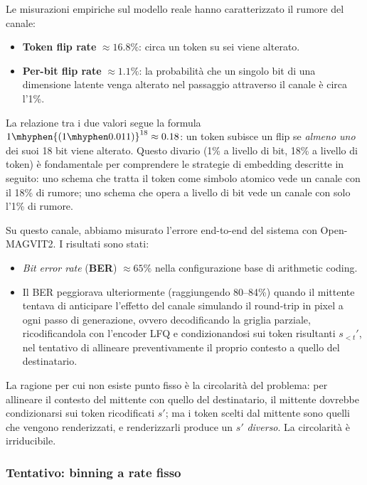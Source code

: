 Le misurazioni empiriche sul modello reale hanno caratterizzato il rumore del canale:

\begin{itemize}
	\item \textbf{Token flip rate} $\approx 16.8\%$: circa un token su sei viene alterato.
	\item \textbf{Per-bit flip rate} $\approx 1.1\%$: la probabilità che un singolo bit di una dimensione latente venga alterato nel passaggio attraverso il canale è circa l'1\%.
\end{itemize}

La relazione tra i due valori segue la formula $1 \mhyphen {(1 \mhyphen 0.011)}^{18} \approx 0.18$: un token subisce un flip se \emph{almeno uno} dei suoi 18 bit viene alterato. Questo divario (1\% a livello di bit, 18\% a livello di token) è fondamentale per comprendere le strategie di embedding descritte in seguito: uno schema che tratta il token come simbolo atomico vede un canale con il 18\% di rumore; uno schema che opera a livello di bit vede un canale con solo l'1\% di rumore.

Su questo canale, abbiamo misurato l'errore end-to-end del sistema con Open-MAGVIT2. I risultati sono stati:

\begin{itemize}
	\item \emph{Bit error rate} (\textbf{BER}) $\approx 65\%$ nella configurazione base di arithmetic coding.
	\item Il BER peggiorava ulteriormente (raggiungendo 80--84\%) quando il mittente tentava di anticipare l'effetto del canale simulando il round-trip in pixel a ogni passo di generazione, ovvero decodificando la griglia parziale, ricodificandola con l'encoder LFQ e condizionandosi sui token risultanti $s_{<t}'$, nel tentativo di allineare preventivamente il proprio contesto a quello del destinatario.
\end{itemize}

La ragione per cui non esiste punto fisso è la circolarità del problema: per allineare il contesto del mittente con quello del destinatario, il mittente dovrebbe condizionarsi sui token ricodificati $s'$; ma i token scelti dal mittente sono quelli che vengono renderizzati, e renderizzarli produce un $s'$ \emph{diverso}. La circolarità è irriducibile.

\subsubsection{Tentativo: binning a rate fisso}

